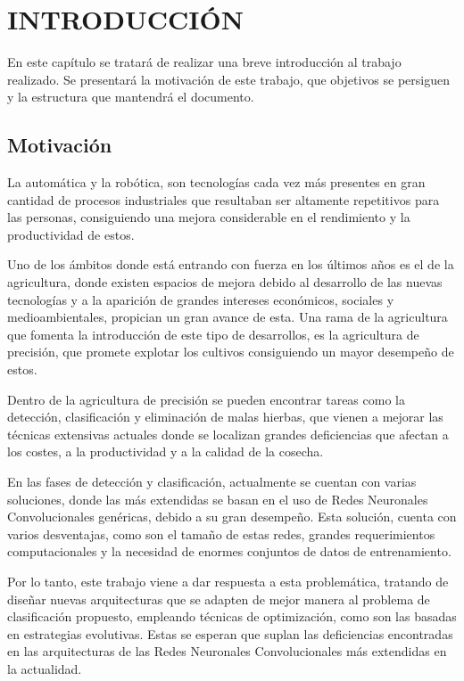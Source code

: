 %
\chapter{INTRODUCCIÓN}
\label{sec:intro}
    
En este capítulo se tratará de realizar una breve introducción al trabajo realizado. Se presentará la motivación de este trabajo, que objetivos se persiguen y la estructura que mantendrá el documento.\\

\section{Motivación}

La automática y la robótica, son tecnologías cada vez más presentes en gran cantidad de procesos industriales que resultaban ser altamente repetitivos para las personas, consiguiendo una mejora considerable en el rendimiento y la productividad de estos.

Uno de los ámbitos donde está entrando con fuerza en los últimos años es el de la agricultura, donde existen espacios de mejora debido al desarrollo de las nuevas tecnologías y a la aparición de grandes intereses económicos, sociales y medioambientales, propician un gran avance de esta. Una rama de la agricultura que fomenta la introducción de este tipo de desarrollos, es la agricultura de precisión, que promete explotar los cultivos consiguiendo un mayor desempeño de estos.

Dentro de la agricultura de precisión se pueden encontrar tareas como la detección, clasificación y eliminación de malas hierbas, que vienen a mejorar las técnicas extensivas actuales donde se localizan grandes deficiencias que afectan a los costes, a la productividad y a la calidad de la cosecha.

En las fases de detección y clasificación, actualmente se cuentan con varias soluciones, donde las más extendidas se basan en el uso de Redes Neuronales Convolucionales genéricas, debido a su gran desempeño. Esta solución, cuenta con varios desventajas, como son el tamaño de estas redes, grandes requerimientos computacionales y la necesidad de enormes conjuntos de datos de entrenamiento.

Por lo tanto, este trabajo viene a dar respuesta a esta problemática, tratando de diseñar nuevas arquitecturas que se adapten de mejor manera al problema de clasificación propuesto, empleando técnicas de optimización, como son las basadas en estrategias evolutivas. Estas se esperan que suplan las deficiencias encontradas en las arquitecturas de las Redes Neuronales Convolucionales más extendidas en la actualidad.

